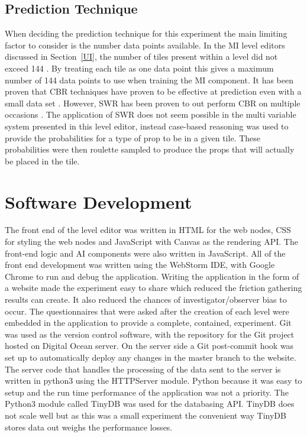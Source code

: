 \documentclass[journal]{IEEEtran}
\begin{document}
\subsection{Prediction Technique}
When deciding the prediction technique for this experiment the main limiting factor to consider is the number data points available. In the MI level editors discussed in Section~\ref{UI},  the number of tiles present within a level did not exceed 144 \cite{alvarez2018fostering, liapis2013sentient, baldwin2017mixed}. By treating each tile as one data point this gives a maximum number of 144 data points to use when training the MI component. It has been proven that CBR techniques have proven to be effective at prediction even with a small data set \cite{shepperd2001comparing,wen2012systematic}. However, SWR has been proven to out perform CBR on multiple occasions \cite{shepperd2001comparing, schroeder2016understanding}. The application of SWR does not seem possible in the multi variable system presented in this level editor, instead case-based reasoning was used to provide the probabilities for a type of prop to be in a given tile. These probabilities were then roulette sampled to produce the props that will actually be placed in the tile. 

\section{Software Development}
The front end of the level editor was written in HTML for the web nodes, CSS for styling the web nodes and JavaScript with Canvas as the rendering API. The front-end logic and AI components were also written in JavaScript. 
All of the front end development was written using the WebStorm IDE, with Google Chrome to run and debug the application. Writing the application in the form of a website made the experiment easy to share which reduced the friction gathering results can create. It also reduced the chances of investigator/observer bias \cite{phillips1999double} to occur. The questionnaires that were asked after the creation of each level were embedded in the application to provide a complete, contained, experiment. Git was used as the version control software, with the repository for the Git project hosted on Digital Ocean server. On the server side a Git post-commit hook was set up to automatically deploy any changes in the master branch to the website. The server code that handles the processing of the data sent to the server is written in python3 using the HTTPServer module. Python because it was easy to setup and the run time performance of the application was not a priority. The Python3 module called TinyDB was used for the databasing API. TinyDB does not scale well but as this was a small experiment the convenient way TinyDB stores data out weighs the performance losses. 
\end{document}

